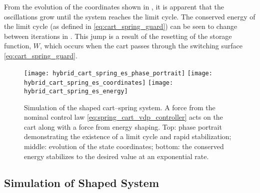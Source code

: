 From the evolution of the coordinates shown in
, it is apparent that the
oscillations grow until the system reaches the limit cycle.
%
The conserved energy of the limit cycle (as defined in
\eqref{eq:cart_spring_guard}) can be seen to change between iterations in .
%
This jump is a result of the resetting of the storage function, $W$, which
occurs when the cart passes through the switching surface
\eqref{eq:cart_spring_guard}.

\begin{figure*}[htp!]
  \centering
  \texttt{[image: hybrid\_cart\_spring\_es\_phase\_portrait]}
  \texttt{[image: hybrid\_cart\_spring\_es\_coordinates]}
  \texttt{[image: hybrid\_cart\_spring\_es\_energy]}
  \caption[Simulation of the shaped cart--spring system.]{Simulation of the
    shaped cart--spring system.
    A force from the nominal control law \eqref{eq:spring_cart_vdp_controller}
    acts on the cart along with a force from energy shaping.
    Top: phase portrait demonstrating the existence of a limit cycle and rapid
    stabilization;
    middle: evolution of the state coordinates;
    bottom: the conserved energy stabilizes to the desired value at an
    exponential rate.}
  \label{fig:cart_spring_simulation_shaped}
\end{figure*}

\subsection{Simulation of Shaped System}
